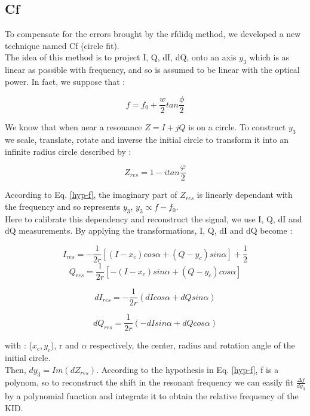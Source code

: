 \subsection{Cf}
To compensate for the errors brought by the rfdidq method, we developed a new technique named Cf (circle fit).\\
The idea of this method is to project I, Q, dI, dQ, onto an axis $y_{3}$ which is as linear as possible with frequency, and so is assumed to be linear with the optical power. In fact, we suppose that :

\begin{equation}
\label{hyp-f}
f = f_{0} + \frac{w}{2} tan\frac{\phi}{2}
\end{equation}

We know that when near a resonance $Z = I+jQ$ is on a circle. To construct $y_{3}$ we scale, translate, rotate and inverse the initial circle to transform it into an infinite radius circle described by :

\begin{equation}
\label{Zres}
Z_{res} = 1 - i tan\frac{\varphi}{2}
\end{equation}

According to Eq. \ref{hyp-f}, the imaginary part of $Z_{res}$ is linearly dependant with the frequency and so represents $y_{3}$, $y_{3} \propto f - f_{0}$.\\
Here to calibrate this dependency and reconstruct the signal, we use I, Q, dI and dQ measurements. By applying the transformations, I, Q, dI and dQ become : 

\begin{equation}
I_{res} = - \frac{1}{2r}[(I-x_{c})cos\alpha + (Q - y_{c})sin \alpha] + \frac{1}{2}
\end{equation}
\begin{equation}
 Q_{res} = \frac{1}{2r}[-(I-x_{c})sin\alpha + (Q - y_{c})cos \alpha] 
\end{equation}

\begin{equation}
dI_{res} = -\frac{1}{2r}(dI cos\alpha + dQ sin\alpha)
\end{equation}

\begin{equation}
dQ_{res} = \frac{1}{2r}(-dI sin\alpha + dQ cos\alpha)
\end{equation}

with : ($x_{c}, y_{c}$), r and $\alpha$ respectively, the center, radius and rotation angle of the initial circle.\\
Then, $dy_{3} = Im(dZ_{res})$. According to the hypothesis in Eq. \ref{hyp-f}, f is a polynom, so to reconstruct the shift in the resonant frequency we can easily fit $\frac{\Delta f}{dy_{3}}$ by a polynomial function and integrate it to obtain the relative frequency of the KID.

